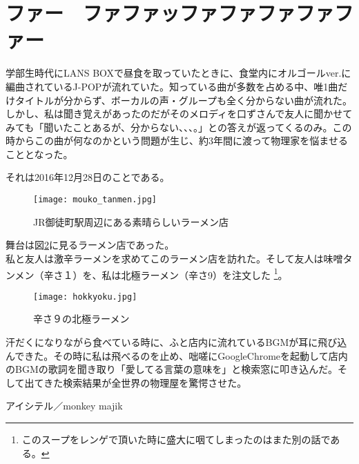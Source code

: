 \newpage
\section{ファー　ファファッファファファファファー}
学部生時代にLANS BOXで昼食を取っていたときに、食堂内にオルゴールver.に編曲されているJ-POPが流れていた。知っている曲が多数を占める中、唯1曲だけタイトルが分からず、ボーカルの声・グループも全く分からない曲が流れた。しかし、私は聞き覚えがあったのだがそのメロディを口ずさんで友人に聞かせてみても「聞いたことあるが、分からない、、、。」との答えが返ってくるのみ。この時からこの曲が何なのかという問題が生じ、約3年間に渡って物理家を悩ませることとなった。\par
それは2016年12月28日のことである。
\begin{figure}[h]
  \centering
  \texttt{[image: mouko\_tanmen.jpg]}
  \caption[]{JR御徒町駅周辺にある素晴らしいラーメン店}
  \label{fig_hoge1}
\end{figure}
舞台は図\ref{fig_hoge2}に見るラーメン店であった。\\私と友人は激辛ラーメンを求めてこのラーメン店を訪れた。そして友人は味噌タンメン（辛さ１）を、私は北極ラーメン（辛さ9）を注文した
\footnote{このスープをレンゲで頂いた時に盛大に咽てしまったのはまた別の話である。}。
\begin{figure}[h]
  \centering
  \texttt{[image: hokkyoku.jpg]}
  \caption[]{辛さ９の北極ラーメン}
  \label{fig_hoge2}
\end{figure}
汗だくになりながら食べている時に、ふと店内に流れているBGMが耳に飛び込んできた。その時に私は飛べるのを止め、咄嗟にGoogleChromeを起動して店内のBGMの歌詞を聞き取り「愛してる言葉の意味を」と検索窓に叩き込んだ。そして出てきた検索結果が全世界の物理屋を驚愕させた。\\
\begin{center}
アイシテル／monkey majik
\end{center}
